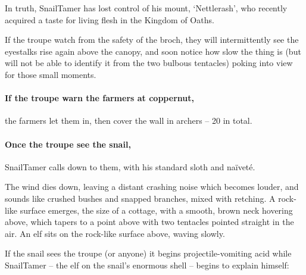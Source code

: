 In truth, \gls{SnailTamer} has lost control of his mount, `Nettlerash', who recently acquired a taste for living flesh in the Kingdom of Oaths.

If the troupe watch from the safety of the \gls{broch},
they will intermittently see the eyestalks rise again above the canopy, and soon notice how slow the thing is (but will not be able to identify it from the two bulbous tentacles) poking into view for those small moments.

\paragraph{If the troupe warn the farmers at \gls{coppernut},}
the farmers let them in, then cover the wall in archers -- 20 in total.

\paragraph{Once the troupe see the snail,}
\gls{SnailTamer} calls down to them, with his standard sloth and na\"ivet\'e.

\begin{boxtext}
  The wind dies down, leaving a distant crashing noise which becomes louder, and sounds like crushed bushes and snapped branches, mixed with  retching.
  A rock-like surface emerges, the size of a cottage, with a smooth, brown neck hovering above, which tapers to a point above with two tentacles pointed straight in the air.
  An elf sits on the rock-like surface above, waving slowly.
\end{boxtext}

\SnailTamer

If the snail sees the troupe (or anyone) it begins projectile-vomiting acid while \gls{SnailTamer} -- the elf on the snail's enormous shell -- begins to explain himself:

